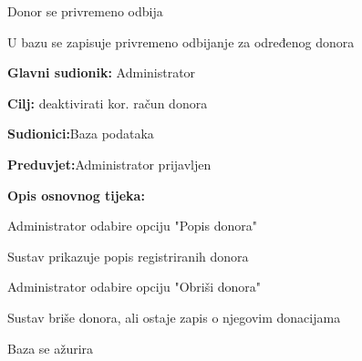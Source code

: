 \begin{packed_item}
\begin{packed_item}
\begin{packed_enum}
			\item Donor se privremeno odbija
			\item U bazu se zapisuje privremeno odbijanje za određenog donora
			\end{packed_enum}
		
		
	\end{packed_item}
	
\end{packed_item}
\eject 

\noindent {}
\begin{packed_item}
	
	\item \textbf{Glavni sudionik: }{Administrator}
	\item  \textbf{Cilj:} {deaktivirati kor. račun donora}
	\item  \textbf{Sudionici:}{Baza podataka}
	\item  \textbf{Preduvjet:}{Administrator prijavljen}
	\item  \textbf{Opis osnovnog tijeka:}
	
	\item[] \begin{packed_enum}
		
		\item {Administrator odabire opciju "Popis donora"}
		\item {Sustav prikazuje popis registriranih donora} 
		\item {Administrator odabire opciju "Obriši donora"}
		\item {Sustav briše donora, ali ostaje zapis o njegovim donacijama}
		\item {Baza se ažurira}
	\end{packed_enum}
	
\end{packed_item}


\noindent {}

